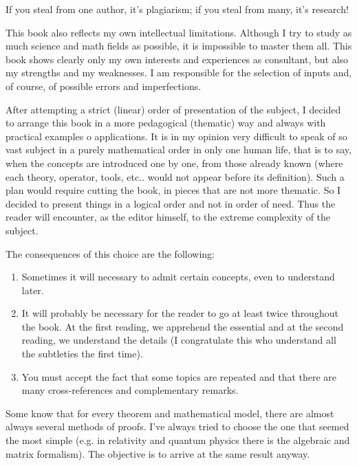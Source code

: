 	\begin{fquote}If you steal from one author, it's plagiarism; if you steal from many, it's research!
 	\end{fquote}

	This book also reflects my own intellectual limitations. Although I try to study as much science and math fields as possible, it is impossible to master them all. This book shows clearly only my own interests and experiences as consultant, but also my strengths and my weaknesses. I am responsible for the selection of inputs and, of course, of possible errors and imperfections.

	After attempting a strict (linear) order of presentation of the subject, I decided to arrange this book in a more pedagogical (thematic) way and always with practical examples o applications. It is in my opinion very difficult to speak of so vast subject in a purely mathematical order in only one human life, that is to say, when the concepts are introduced one by one, from those already known (where each theory, operator, tools, etc.. would not appear before its definition). Such a plan would require cutting the book, in pieces that are not more thematic. So I decided to present things in a logical order and not in order of need. Thus the reader will encounter, as the editor himself, to the extreme complexity of the subject.

	The consequences of this choice are the following:
	\begin{enumerate}
		\item Sometimes it will necessary to admit certain concepts, even to understand later.
	
		\item It will probably be necessary for the reader to go at least twice throughout the book. At the first reading, we apprehend the essential and at the second reading, we understand the details (I congratulate this who understand all the subtleties the first time).
	
		\item You must accept the fact that some topics are repeated and that there are many cross-references and complementary remarks.
	\end{enumerate}
	
	Some know that for every theorem and mathematical model, there are almost always several methods of proofs. I've always tried to choose the one that seemed the most simple (e.g. in relativity and quantum physics there is the algebraic and matrix formalism). The objective is to arrive at the same result anyway.
	
